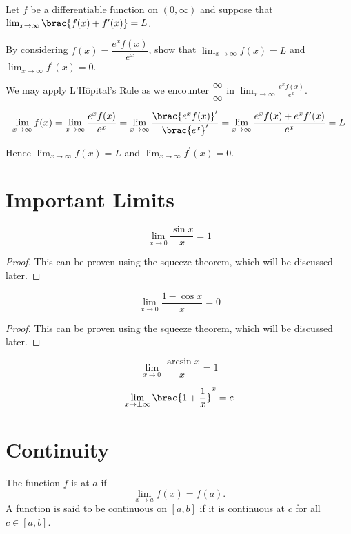 \begin{exercise}
Let $f$ be a differentiable function on $(0,\infty)$ and suppose that $\lim_{x\to\infty}\brac{f(x)+f^\prime(x)}=L$.

By considering $f(x)=\dfrac{e^xf(x)}{e^x}$, show that $\lim_{x\to\infty}f(x)=L$ and $\lim_{x\to\infty}f^\prime(x)=0$.
\end{exercise}

\begin{solution}
We may apply L'H\^{o}pital's Rule as we encounter $\dfrac{\infty}{\infty}$ in $\displaystyle\lim_{x\to\infty}\frac{e^xf(x)}{e^x}$.

\[ \lim_{x\to\infty}f(x)=\lim_{x\to\infty}\frac{e^xf(x)}{e^x}=\lim_{x\to\infty}\frac{\brac{e^xf(x)}^\prime}{\brac{e^x}^\prime}=\lim_{x\to\infty}\frac{e^xf(x)+e^xf^\prime(x)}{e^x}=L \]

Hence $\lim_{x\to\infty}f(x)=L$ and $\lim_{x\to\infty}f^\prime(x)=0$.
\end{solution}
\pagebreak

\section{Important Limits}
\begin{equation}
\lim_{x \to 0} \frac{\sin x}{x} = 1
\end{equation}
\begin{proof}
This can be proven using the squeeze theorem, which will be discussed later.
\end{proof}

\begin{equation}
\lim_{x \to 0} \frac{1-\cos x}{x} = 0
\end{equation}
\begin{proof}
This can be proven using the squeeze theorem, which will be discussed later.
\end{proof}

\begin{equation}
\lim_{x\to 0} \frac{\arcsin x}{x} = 1
\end{equation}

\begin{equation}
\lim_{x\to \pm\infty} \brac{1+\frac{1}{x}}^x=e
\end{equation}
\pagebreak

\section{Continuity}
\begin{definition}[Continuity]
The function $f$ is  at $a$ if 
\[\lim_{x\to a}f(x)=f(a).\]
A function is said to be continuous on $[a,b]$ if it is continuous at $c$ for all $c\in[a,b]$.
\end{definition}


